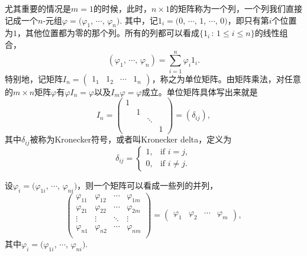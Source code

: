 尤其重要的情况是$m=1$的时候，此时，$n\times 1$的矩阵称为一个列，一个列我们直接记成一个$n$-元组$\varphi=(\varphi_1$, $\cdots$, $\varphi_n)$. 其中，记$1_i=(0$, $\cdots$, $1$, $\cdots$, $0)$，即只有第$i$个位置为$1$，其他位置都为零的那个列。所有的列都可以看成$\{1_i\,:\, 1\leq i \leq n\}$的线性组合，
\[
	(\varphi_1,\,\cdots\!,\,\varphi_n)=\sum_{i=1}^n\varphi_i1_i.
\]
特别地，记矩阵$I_n=\begin{pmatrix}1_{1} & 1_{2} & \cdots & 1_{n}\end{pmatrix}$，称之为单位矩阵。由矩阵乘法，对任意的$m\times n$矩阵$\varphi$有$\varphi I_n=\varphi$以及$I_m\varphi =\varphi$成立。单位矩阵具体写出来就是
\[
	I_n=
		\begin{pmatrix}
			1 & & &\\
			& 1 & &\\
			& & \ddots &\\
			& & & 1
		\end{pmatrix}
	=(\delta_{ij}),
\]
其中$\delta_{ij}$被称为Kronecker符号，或者叫Kronecker delta，定义为
\[
	\delta_{{ij}}=
	\begin{cases}
	1,&\text{if } i=j,\\
	0,&\text{if } i\neq j.
	\end{cases}
\]

设$\varphi_{i}=(\varphi_{1i}$, $\cdots$, $\varphi_{ni})$，则一个矩阵可以看成一些列的并列，
\[
	\begin{pmatrix}
	\varphi_{11} & \varphi_{12} & \cdots & \varphi_{1m}\\
	\varphi_{21} & \varphi_{22} & \cdots & \varphi_{2m}\\
	\vdots & \vdots & \ddots & \vdots \\
	\varphi_{n1} & \varphi_{n2} & \cdots & \varphi_{nm}\\
	\end{pmatrix}
	=
	\begin{pmatrix}
	\varphi_{1} & \varphi_{2} & \cdots & \varphi_{m}
	\end{pmatrix},
\]
其中$\varphi_i=(\varphi_{1i}$, $\cdots$, $\varphi_{ni})$. 


